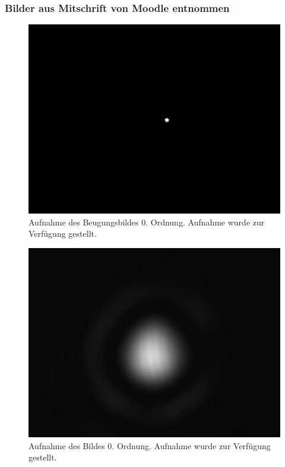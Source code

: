 \documentclass{article}
\begin{document}
\subsubsection{Bilder aus Mitschrift von Moodle entnommen}




\begin{minipage}[t]{.45\textwidth}
\begin{figure}[H]
\includegraphics[scale=0.1]{jw/L_BB_5.jpg}
\caption{Aufnahme des Beugungsbildes 0. Ordnung. Aufnahme wurde zur Verfügung gestellt.}
\label{fig:bbild_0_jw}
\end{figure}
\end{minipage}
\hfill
\noindent
\begin{minipage}[t]{.45\textwidth}
\begin{figure}[H]
\includegraphics[scale=0.1]{jw/L_OB_5.jpg}
\caption{Aufnahme des Bildes 0. Ordnung. Aufnahme wurde zur Verfügung gestellt.}\label{fig:bild_0_jw}
\end{figure}
\end{minipage}
\end{document}
